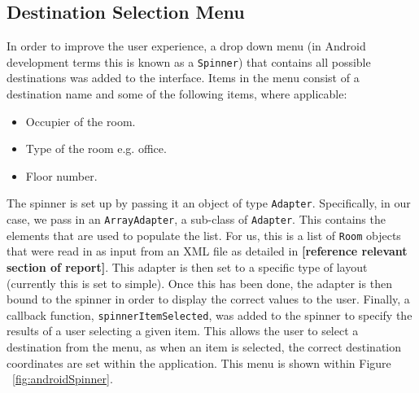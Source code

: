 \documentclass[12pt,a4paper]{report}
\begin{document}
        \subsection{Destination Selection Menu}
            In order to improve the user experience, a drop down menu (in Android development terms this is known as a \texttt{Spinner}) that contains
            all possible destinations was added to the interface. Items in the menu consist of a destination name and some of the following items,
            where applicable:
            \begin{itemize}
                \item Occupier of the room.
                \item Type of the room e.g. office.
                \item Floor number.
            \end{itemize}
            The spinner is set up by passing it an object of type \texttt{Adapter}. Specifically, in our case, we pass in an \texttt{ArrayAdapter}, a sub-class of \texttt{Adapter}.
            This contains the elements
            that are used to populate the list. For us, this is a list of \texttt{Room} objects that were read in as input from an XML file as detailed in
            \textbf{[reference relevant section of report]}.
            This adapter is then set to a specific type of layout (currently this is set to simple). Once this has been done, the adapter is then bound to the spinner in order to display
            the correct values to the user. Finally, a callback function, \texttt{spinnerItemSelected}, was added to the spinner to specify the results of a user selecting a given item.
            This allows the user to select a destination from the menu, as when an item is selected, the correct destination coordinates are set within the application. This menu is shown within Figure ~\ref{fig:androidSpinner}.
       
\end{document}
